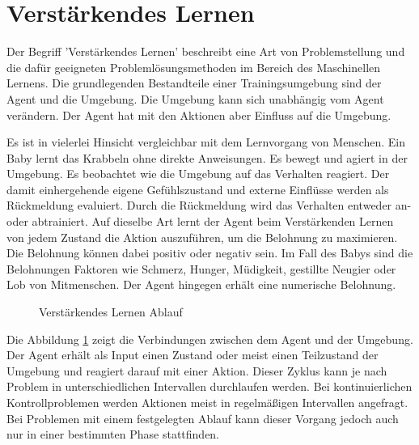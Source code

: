 {\section{Verstärkendes Lernen}}
\label{sec:rl}
Der Begriff 'Verstärkendes Lernen' beschreibt eine Art von Problemstellung und die dafür geeigneten Problemlösungsmethoden im Bereich des Maschinellen Lernens. Die grundlegenden Bestandteile einer Trainingsumgebung sind der Agent und die Umgebung. Die Umgebung kann sich unabhängig vom Agent verändern. Der Agent hat mit den Aktionen aber Einfluss auf die Umgebung. 

Es ist in vielerlei Hinsicht vergleichbar mit dem Lernvorgang von Menschen. Ein Baby lernt das Krabbeln ohne direkte Anweisungen. Es bewegt und agiert in der Umgebung. Es beobachtet wie die Umgebung auf das Verhalten reagiert. Der damit einhergehende eigene Gefühlszustand und externe Einflüsse werden als Rückmeldung evaluiert. Durch die Rückmeldung wird das Verhalten entweder an- oder abtrainiert. Auf dieselbe Art lernt der Agent beim Verstärkenden Lernen von jedem Zustand die Aktion auszuführen, um die Belohnung zu maximieren. Die Belohnung können dabei positiv oder negativ sein. Im Fall des Babys sind die Belohnungen Faktoren wie Schmerz, Hunger, Müdigkeit, gestillte Neugier oder Lob von Mitmenschen. Der Agent hingegen erhält eine numerische Belohnung.\cite{sutton2018reinforcement}

\begin{figure}[H]
  \centering
  \caption{Verstärkendes Lernen Ablauf}
  \label{fig:vl_ablauf}
\end{figure}

Die Abbildung \ref{fig:vl_ablauf} zeigt die Verbindungen zwischen dem Agent und der Umgebung. Der Agent erhält als Input einen Zustand oder meist einen Teilzustand der Umgebung und reagiert darauf mit einer Aktion. Dieser Zyklus kann je nach Problem in unterschiedlichen Intervallen durchlaufen werden. Bei kontinuierlichen Kontrollproblemen werden Aktionen meist in regelmäßigen Intervallen angefragt. Bei Problemen mit einem festgelegten Ablauf kann dieser Vorgang jedoch auch nur in einer bestimmten Phase stattfinden.